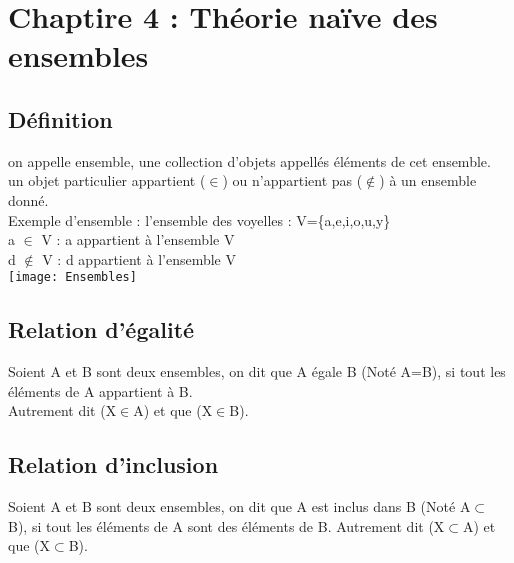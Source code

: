\newpage

\chapter{Chaptire 4 : Théorie naïve des ensembles}
\vspace{4mm} %

\section{Définition}
\vspace{4mm} %

on appelle ensemble, une collection d'objets appellés éléments de cet ensemble.\\
un objet particulier appartient ($\in$) ou n'appartient pas ($\notin$) à un ensemble donné.\\

Exemple d'ensemble : l'ensemble des voyelles : V=\{a,e,i,o,u,y\} \\

a $\in$ V : a appartient à l'ensemble V \\
d $\notin$ V : d appartient à l'ensemble V \\

\texttt{[image: Ensembles]}
\vspace{5mm} %

\section{Relation d'égalité}
\vspace{3mm} %

Soient A et B sont deux ensembles, on dit que A égale B (Noté A=B), si tout les éléments de A appartient à B.\\
Autrement dit (X$\in$A) et que (X$\in$B).\\

\section{Relation d'inclusion}
\vspace{3mm} %

Soient A et B sont deux ensembles, on dit que A est inclus dans B (Noté A$\subset$ B), si tout les éléments de A sont des éléments de B. Autrement dit (X$\subset$A) et que (X$\subset$B).\\

